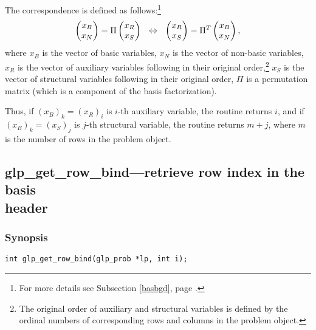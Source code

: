 The correspondence is defined as follows:\footnote{For more details see
Subsection \ref{basbgd}, page \pageref{basbgd}.}
$$\left(\begin{array}{@{}c@{}}x_B\\x_N\\\end{array}\right)=
\Pi\left(\begin{array}{@{}c@{}}x_R\\x_S\\\end{array}\right)
\ \ \Leftrightarrow
\ \ \left(\begin{array}{@{}c@{}}x_R\\x_S\\\end{array}\right)=
\Pi^T\left(\begin{array}{@{}c@{}}x_B\\x_N\\\end{array}\right),$$
where $x_B$ is the vector of basic variables, $x_N$ is the vector of
non-basic variables, $x_R$ is the vector of auxiliary variables
following in their original order,\footnote{The original order of
auxiliary and structural variables is defined by the ordinal numbers
of corresponding rows and columns in the problem object.} $x_S$ is the
vector of structural variables following in their original order, $\Pi$
is a permutation matrix (which is a component of the basis
factorization).

Thus, if $(x_B)_k=(x_R)_i$ is $i$-th auxiliary variable, the routine
returns $i$, and if $(x_B)_k=(x_S)_j$ is $j$-th structural variable,
the routine returns $m+j$, where $m$ is the number of rows in the
problem object.


\newpage

\subsection{glp\_get\_row\_bind---retrieve row index in the basis\\
header}

\subsubsection*{Synopsis}

\begin{verbatim}
int glp_get_row_bind(glp_prob *lp, int i);
\end{verbatim}


